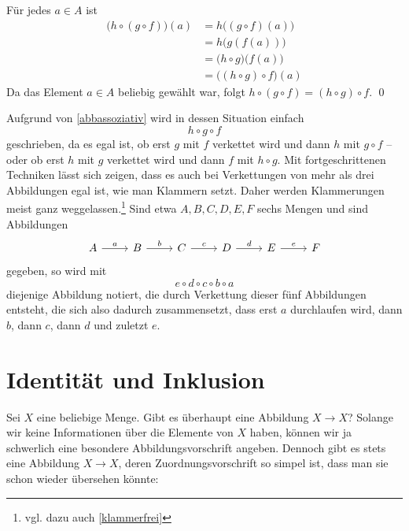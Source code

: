 \begin{bew}
    Für jedes $a \in A$ ist
    \begin{align*}
        \bigl(h \circ (g \circ f)\bigr)(a) & =h\bigl((g \circ f)(a)\bigr)\\
        & =h\bigl(g(f(a))\bigr) \\
        & =\bigl(h \circ g\bigr) \bigl(f(a)\bigr) \\
        & = \bigl((h \circ g) \circ f\bigr) (a)	
    \end{align*}
    Da das Element $a\in A$ beliebig gewählt war, folgt $h\circ (g\circ f) = (h\circ g)\circ f$. \qed
\end{bew}


\begin{bem} \label{abbklammerfrei}
    Aufgrund von \cref{abbassoziativ} wird in dessen Situation einfach
        \[ h\circ g\circ f \]
    geschrieben, da es egal ist, ob erst $g$ mit $f$ verkettet wird und dann $h$ mit $g\circ f$ -- oder ob erst $h$ mit $g$ verkettet wird und dann $f$ mit $h\circ g$. Mit fortgeschrittenen Techniken lässt sich zeigen, dass es auch bei Verkettungen von mehr als drei Abbildungen egal ist, wie man Klammern setzt. Daher werden Klammerungen meist ganz weggelassen.\footnote{vgl. dazu auch \cref{klammerfrei}} Sind etwa $A,B,C,D,E,F$ sechs Mengen und sind Abbildungen
    \[\begin{tikzcd}
        A \ar[r, "a"] & B \ar[r, "b"] & C \ar[r, "c"] & D \ar[r, "d"] & E \ar[r, "e"] & F
    \end{tikzcd}\]
    gegeben, so wird mit
        \[ e\circ d\circ c\circ b\circ a \]
    diejenige Abbildung notiert, die durch Verkettung dieser fünf Abbildungen entsteht, die sich also dadurch zusammensetzt, dass erst $a$ durchlaufen wird, dann $b$, dann $c$, dann $d$ und zuletzt $e$.
\end{bem}





\section{Identität und Inklusion}


Sei $X$ eine beliebige Menge. Gibt es überhaupt eine Abbildung $X\to X$? Solange wir keine Informationen über die Elemente von $X$ haben, können wir ja schwerlich eine besondere Abbildungsvorschrift angeben. Dennoch gibt es stets eine Abbildung $X\to X$, deren Zuordnungsvorschrift so simpel ist, dass man sie schon wieder übersehen könnte:


